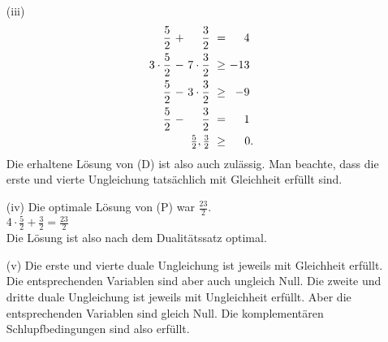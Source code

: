 \documentclass [a4paper,11pt]{article}
\begin{document}
\begin{enumerate}
\begin{enumerate}
\begin{enumerate}
                \item[(iii)]
                    \begin{align*}
                    \begin{alignedat}{4}
                    &&  \frac{5}{2} &\ + &\  \frac{3}{2} &\ = &\ 4\ \\
                    && 3 \cdot \frac{5}{2} &\ - &\ 7 \cdot \frac{3}{2} &\ \geq &\ -13\ \\
                    &&  \frac{5}{2} &\ - &\ 3 \cdot \frac{3}{2} &\ \geq &\ -9\ \\
                    &&  \frac{5}{2} &\ - &\  \frac{3}{2} &\ = &\ 1\ \\
                    && & & \llap{$\frac{5}{2},\frac{3}{2}$} &\ \geq &\ 0.
                    \end{alignedat}
                    \end{align*}
                    Die erhaltene Lösung von (D) ist also auch zulässig. Man beachte, dass die erste und vierte Ungleichung tatsächlich mit Gleichheit erfüllt
                    sind.
                \item[(iv)]
                    Die optimale Lösung von (P) war $\frac{23}{2}$.\\
                    $ 4 \cdot \frac{5}{2} + \frac{3}{2} = \frac{23}{2} $\\
                    Die Lösung ist also nach dem Dualitätssatz optimal.

                \item[(v)]
                    Die erste und vierte duale Ungleichung ist jeweils mit Gleichheit erfüllt. Die entsprechenden Variablen sind aber auch ungleich Null.
                    Die zweite und dritte duale Ungleichung ist jeweils mit Ungleichheit erfüllt. Aber die entsprechenden Variablen sind gleich Null.
                    Die komplementären Schlupfbedingungen sind also erfüllt.



\end{enumerate}
\end{enumerate}
\end{enumerate}
\end{document}
